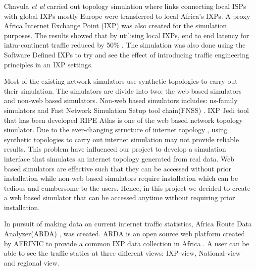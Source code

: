 Chavula \textit{et al} \cite{simulation11} carried out topology simulation where links connecting local ISPs with global IXPs mostly Europe were transferred to local Africa’s IXPs. A proxy Africa Internet Exchange Point (IXP) was also created for the simulation purposes. The results showed that by utilising local IXPs, end to end latency for intra-continent traffic reduced by 50\% \cite{simulation11}. The simulation was also done using the Software Defined IXPs to try and see the effect of introducing traffic engineering principles in an IXP settings. 

Most of the existing network simulators use synthetic topologies to carry out their simulation. The simulators are divide into two: the web based simulators and non-web based simulators. Non-web based simulators includes: ns-family simulators\cite{ns3} and Fast Network Simulation Setup tool chain(FNSS) \cite{simulation2}. IXP Jedi tool\cite{JEDI:online} that has been developed RIPE Atlas is one of the web based network topology simulator. Due to the ever-changing structure of internet topology \cite{simulation1}, using synthetic topologies to carry out internet simulation may not provide reliable results. This problem have influenced our project to develop a simulation interface that simulates an internet topology generated from real data. Web based simulators are effective such that they can be accessed without prior installation while non-web based simulators require installation which can be tedious and cumbersome to the users. Hence, in this project we decided to create a web based simulator that can be accessed anytime without requiring prior installation. 

In pursuit of making data on current internet traffic statistics, Africa
Route Data Analyzer(ARDA) \cite{AfricanR17:online,fanou2019system}, was created. ARDA is an open source web platform created by AFRINIC to provide a common IXP data collection in Africa \cite{AfricanR17:online}. A user can be able to see the traffic statics at three different views: IXP-view, National-view and regional
view. 



